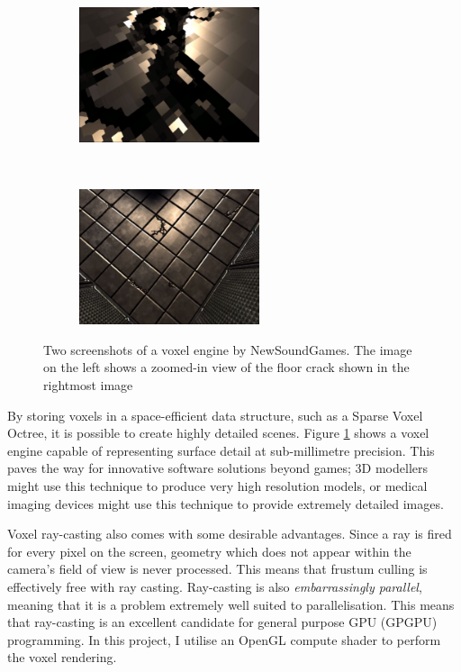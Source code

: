 \begin{figure}[ht]
    \centering
    \begin{subfigure}{0.5\textwidth}
        \centering
        \includegraphics[width=200px]{graphics/newsoundgames_svo_coarse.png}
    \end{subfigure}%
    ~
    \begin{subfigure}{0.5\textwidth}
        \centering
        \includegraphics[width=200px]{graphics/newsoundgames_svo_fine.png}
    \end{subfigure}
    
    \caption{Two screenshots of a voxel engine by NewSoundGames\autocite{newsoundgames2012}. The image on the left shows a zoomed-in view of the floor crack shown in the rightmost image}
    \label{fig:voxel_details}
\end{figure}

By storing voxels in a space-efficient data structure, such as a Sparse Voxel Octree, it is possible to create highly detailed scenes. Figure \ref{fig:voxel_details} shows a voxel engine capable of representing surface detail at sub-millimetre precision. This paves the way for innovative software solutions beyond games; 3D modellers might use this technique to produce very high resolution models, or medical imaging devices might use this technique to provide extremely detailed images.

Voxel ray-casting also comes with some desirable advantages. Since a ray is fired for every pixel on the screen, geometry which does not appear within the camera's field of view is never processed. This means that frustum culling is effectively free with ray casting. Ray-casting is also \textit{embarrassingly parallel}, meaning that it is a problem extremely well suited to parallelisation. This means that ray-casting is an excellent candidate for general purpose GPU (GPGPU) programming. In this project, I utilise an OpenGL compute shader to perform the voxel rendering.

